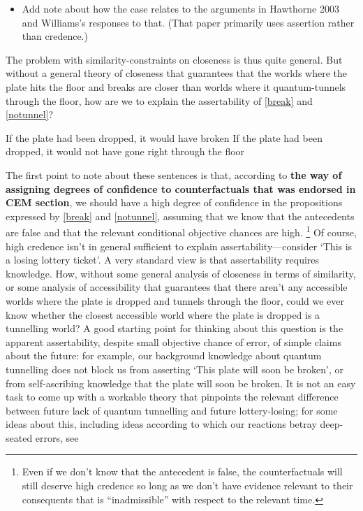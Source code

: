 \documentclass[If.tex]{subfiles}
\begin{document}
\begin{itemize}
\item
  Add note about how the case relates to the arguments in Hawthorne 2003 and Williams's responses to that. (That paper primarily uses assertion rather than credence.)
\end{itemize}

The problem with similarity-constraints on closeness is thus quite general. But without a general theory of closeness that guarantees that the worlds where the plate hits the floor and breaks are closer than worlds where it quantum-tunnels through the floor, how are we to explain the assertability of \ref{break} and \ref{notunnel}?
\begin{prop}
\nitem \label{break}
  If the plate had been dropped, it would have broken
\nitem \label{notunnel}
  If the plate had been dropped, it would not have gone right through the floor
\end{prop}
The first point to note about these sentences is that, according to \textbf{the way of assigning degrees of confidence to counterfactuals that was endorsed in CEM section}, we should have a high degree of confidence in the propositions expressed by \ref{break} and \ref{notunnel}, assuming that we know that the antecedents are false and that the relevant conditional objective chances are high.%
\footnote{Even if we don't know that the antecedent is false, the counterfactuals will still deserve high credence so long as we don't have evidence relevant to their consequents that is “inadmissible” with respect to the relevant time.} 
Of course, high credence isn't in general sufficient to explain assertability---consider ‘This is a losing lottery ticket’. A very standard view is that assertability requires knowledge. How, without some general analysis of closeness in terms of similarity, or some analysis of accessibility that guarantees that there aren't any accessible worlds where the plate is dropped and tunnels through the floor, could we ever know whether the closest accessible world where the plate is dropped is a tunnelling world? A good starting point for thinking about this question is the apparent assertability, despite small objective chance of error, of simple claims about the future: for example, our background knowledge about quantum tunnelling does not block us from asserting ‘This plate will soon be broken’, or from self-ascribing knowledge that the plate will soon be broken. It is not an easy task to come up with a workable theory that pinpoints the relevant difference between future lack of quantum tunnelling and future lottery-losing; for some ideas about this, including ideas according to which our reactions betray deep-seated errors, see
\end{document}
